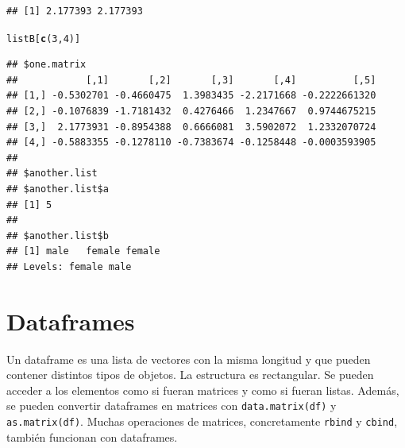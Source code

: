 \documentclass{config/apuntes}\usepackage[]{graphicx}\usepackage[]{xcolor}
\makeatletter
\newcommand{\hlnum}[1]{\textcolor[rgb]{0.686,0.059,0.569}{#1}}%
\newcommand{\hldef}[1]{\textcolor[rgb]{0.345,0.345,0.345}{#1}}%
\newcommand{\hlkwd}[1]{\textcolor[rgb]{0.737,0.353,0.396}{\textbf{#1}}}%
\newenvironment{kframe}{%
 \def\at@end@of@kframe{}%
 \ifinner\ifhmode%
  \def\at@end@of@kframe{\end{minipage}}%
  \begin{minipage}{\columnwidth}%
 \fi\fi%
 \def\FrameCommand##1{\hskip\@totalleftmargin \hskip-\fboxsep
 \colorbox{shadecolor}{##1}\hskip-\fboxsep
     \hskip-\linewidth \hskip-\@totalleftmargin \hskip\columnwidth}%
 \MakeFramed {\advance\hsize-\width
   \@totalleftmargin\z@ \linewidth\hsize
   \@setminipage}}%
 {\par\unskip\endMakeFramed%
 \at@end@of@kframe}
\newenvironment{knitrout}{}{} %
\newcommand{\code}[1]{\texttt{#1}}
\makeatother
\begin{document}
\begin{knitrout}
\begin{kframe}
\begin{alltt}
\end{alltt}
\begin{verbatim}
## [1] 2.177393 2.177393
\end{verbatim}
\begin{alltt}
\hldef{listB[}\hlkwd{c}\hldef{(}\hlnum{3}\hldef{,} \hlnum{4}\hldef{)]}
\end{alltt}
\begin{verbatim}
## $one.matrix
##            [,1]       [,2]       [,3]       [,4]          [,5]
## [1,] -0.5302701 -0.4660475  1.3983435 -2.2171668 -0.2222661320
## [2,] -0.1076839 -1.7181432  0.4276466  1.2347667  0.9744675215
## [3,]  2.1773931 -0.8954388  0.6666081  3.5902072  1.2332070724
## [4,] -0.5883355 -0.1278110 -0.7383674 -0.1258448 -0.0003593905
## 
## $another.list
## $another.list$a
## [1] 5
## 
## $another.list$b
## [1] male   female female
## Levels: female male
\end{verbatim}
\end{kframe}
\end{knitrout}

\section{Dataframes}
Un dataframe es una lista de vectores con la misma longitud y que pueden contener distintos tipos de objetos. La estructura es rectangular. Se pueden acceder a los elementos como si fueran matrices y como si fueran listas. Además, se pueden convertir dataframes en matrices con \code{data.matrix(df)} y \code{as.matrix(df)}. Muchas operaciones de matrices, concretamente \code{rbind} y \code{cbind}, también funcionan con dataframes.
\end{document}
